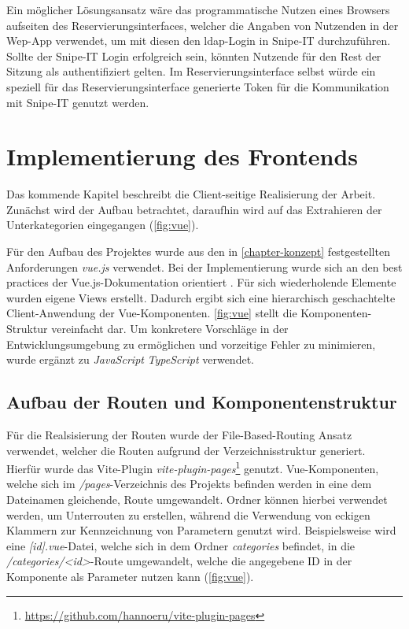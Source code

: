 Ein möglicher Lösungsansatz wäre das programmatische Nutzen eines Browsers aufseiten des
Reservierungsinterfaces, welcher die Angaben von Nutzenden in der Wep-App verwendet, um mit diesen
den \ac{ldap}-Login in Snipe-IT durchzuführen. Sollte der Snipe-IT Login erfolgreich sein, könnten
Nutzende für den Rest der Sitzung als authentifiziert gelten. Im Reservierungsinterface selbst
würde ein speziell für das Reservierungsinterface generierte Token für die Kommunikation mit
Snipe-IT genutzt werden.

\section{Implementierung des Frontends}
\label{subsec:frontend}
Das kommende Kapitel beschreibt die Client-seitige Realisierung der Arbeit. Zunächst wird der Aufbau
betrachtet, daraufhin wird auf das Extrahieren der Unterkategorien eingegangen (\ref{fig:vue}).


Für den Aufbau des Projektes wurde aus den in \ref{chapter-konzept} festgestellten Anforderungen
\textit{vue.js} verwendet. Bei der Implementierung wurde sich an den best practices der
Vue.js-Dokumentation orientiert . Für sich wiederholende Elemente wurden
eigene Views erstellt. Dadurch ergibt sich eine hierarchisch geschachtelte Client-Anwendung der
Vue-Komponenten. \ref{fig:vue} stellt die Komponenten-Struktur vereinfacht dar. Um
konkretere Vorschläge in der Entwicklungsumgebung zu ermöglichen und vorzeitige Fehler zu
minimieren, wurde ergänzt zu \textit{JavaScript} \textit{TypeScript} verwendet.

\subsection{Aufbau der Routen und Komponentenstruktur}
Für die Realsisierung der Routen wurde der File-Based-Routing Ansatz verwendet, welcher die Routen
aufgrund der Verzeichnisstruktur generiert. Hierfür wurde das Vite-Plugin
\textit{vite-plugin-pages}\footnote{\url{https://github.com/hannoeru/vite-plugin-pages}} genutzt.
Vue-Komponenten, welche sich im \textit{/pages}-Verzeichnis des Projekts befinden werden in eine
dem Dateinamen gleichende, Route umgewandelt. Ordner können hierbei verwendet werden, um Unterrouten
zu erstellen, während die Verwendung von eckigen Klammern zur Kennzeichnung von Parametern genutzt
wird. Beispielsweise wird eine \textit{[id].vue}-Datei, welche sich in dem Ordner
\textit{categories} befindet, in die \textit{/categories/<id>}-Route umgewandelt, welche die
angegebene ID in der Komponente als Parameter nutzen kann (\ref{fig:vue}).

